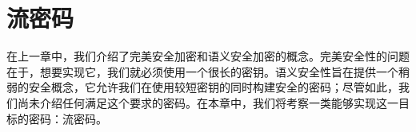 \chapter{流密码}\label{chap:3}

在上一章中，我们介绍了完美安全加密和语义安全加密的概念。完美安全性的问题在于，想要实现它，我们就必须使用一个很长的密钥。语义安全性旨在提供一个稍弱的安全概念，它允许我们在使用较短密钥的同时构建安全的密码；尽管如此，我们尚未介绍任何满足这个要求的密码。在本章中，我们将考察一类能够实现这一目标的密码：流密码。
















